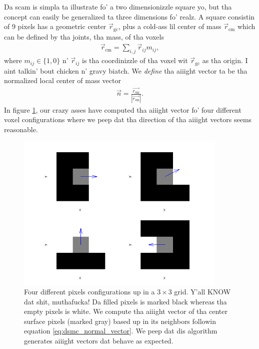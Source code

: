 Da scam is simpla ta illustrate fo' a two dimensionizzle square yo, but tha concept can easily be generalized ta three dimensions fo' realz. A square consistin of 9 pixels has a geometric center $\vec r_\text{gc}$, plus a cold-ass lil center of mass $\vec r_\text{cm}$ which can be defined by tha joints, tha mass, of tha voxels
\begin{align}
	\vec r_\text{cm} = \sum_{i,j} \vec r_{ij}m_{ij},
\end{align}
where $m_{ij} \in \{1,0\}$ n' $\vec r_{ij}$ is tha coordinizzle of tha voxel wit $\vec r_\text{gc}$ as tha origin. I aint talkin' bout chicken n' gravy biatch. We \textit{define} tha aiiight vector ta be tha normalized local center of mass vector
\begin{align}
	\label{eq:dsmc_normal_vector}
	\vec n = \frac{\vec{r_\text{cm}}}{|\vec{r_\text{cm}}|}.
\end{align}
In figure \ref{fig:dsmc_normal_vectors}, our crazy asses have computed tha aiiight vector fo' four different voxel configurations where we peep dat tha direction of tha aiiight vectors seems reasonable. 
\begin{figure}[htb]
\begin{center}
\includegraphics[width=0.9\textwidth, trim=0cm 0cm 0cm 0cm, clip]{DSMC/figures/normal_vectors.png}
\end{center}
\caption{Four different pixels configurations up in a $3\times 3$ grid. Y'all KNOW dat shit, muthafucka! Da filled pixels is marked black whereas tha empty pixels is white. We compute tha aiiight vector of tha center surface pixels (marked gray) based up in its neighbors followin equation \eqref{eq:dsmc_normal_vector}. We peep dat dis algorithm generates aiiight vectors dat behave as expected.}
\label{fig:dsmc_normal_vectors}
\end{figure}

